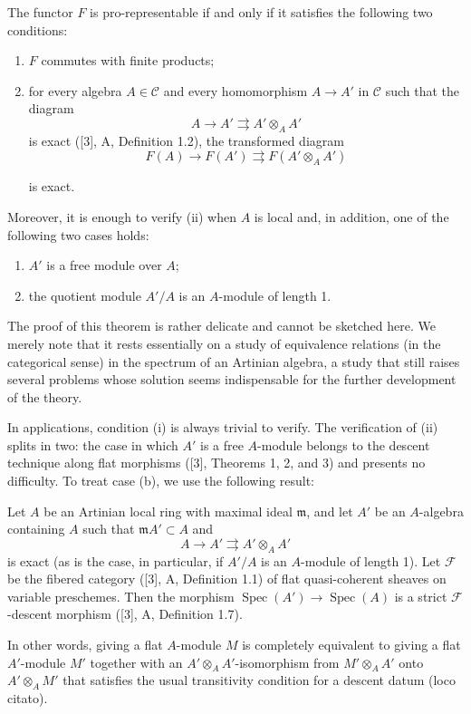  The functor $F$ is pro-representable if and only if it
satisfies the following two conditions:
\begin{enumerate}
\item[(i)] $F$ commutes with finite products;
\item[(ii)] for every algebra $A\in\mathcal C$ and every homomorphism
$A\longrightarrow A'$ in $\mathcal C$ such that the diagram
\[
  A\longrightarrow A'\rightrightarrows A'\otimes_A A'
\]
is exact ([3], A, Definition 1.2), the transformed diagram
\[
  F(A)\longrightarrow F(A')\rightrightarrows F(A'\otimes_A A')
\]

is exact.
\end{enumerate}
Moreover, it is enough to verify (ii) when $A$ is local and, in addition, one
of the following two cases holds:
\begin{enumerate}
\item[(a)] $A'$ is a free module over $A$;
\item[(b)] the quotient module $A'/A$ is an $A$-module of length 1.
\end{enumerate}

The proof of this theorem is rather delicate and cannot be sketched here. We
merely note that it rests essentially on a study of equivalence relations (in
the categorical sense) in the spectrum of an Artinian algebra, a study that
still raises several problems whose solution seems indispensable for the
further development of the theory.

In applications, condition (i) is always trivial to verify. The verification
of (ii) splits in two: the case in which $A'$ is a free $A$-module belongs to
the descent technique along flat morphisms ([3], Theorems 1, 2, and 3) and
presents no difficulty. To treat case (b), we use the following result:

 Let $A$ be an Artinian local ring with maximal ideal
$\mathfrak m$, and let $A'$ be an $A$-algebra containing $A$ such that
$\mathfrak mA'\subset A$ and
\[
  A\longrightarrow A'\rightrightarrows A'\otimes_A A'
\]
is exact (as is the case, in particular, if $A'/A$ is an $A$-module of length
1). Let $\mathcal F$ be the fibered category ([3], A, Definition 1.1) of flat
quasi-coherent sheaves on variable preschemes. Then the morphism
$\operatorname{Spec}(A')\longrightarrow\operatorname{Spec}(A)$ is a strict
$\mathcal F$-descent morphism ([3], A, Definition 1.7).

In other words, giving a flat $A$-module $M$ is completely equivalent to
giving a flat $A'$-module $M'$ together with an
$A'\otimes_AA'$-isomorphism from $M'\otimes_AA'$ onto $A'\otimes_AM'$ that
satisfies the usual transitivity condition for a descent datum (loco citato).

